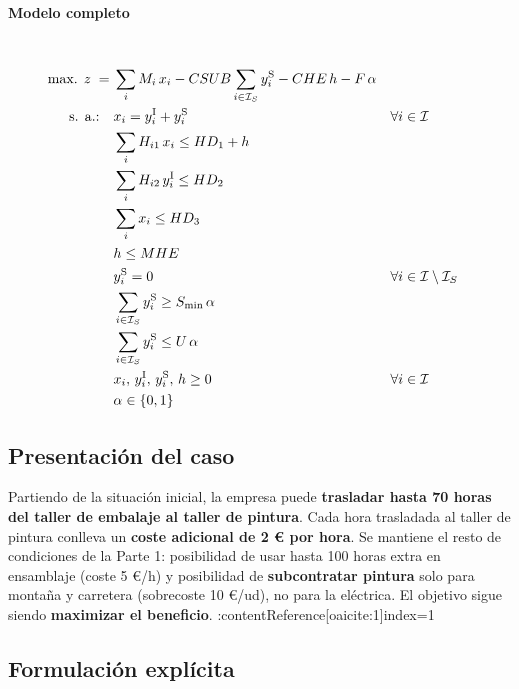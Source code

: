 \paragraph{Modelo completo}\mbox{}\\[-1mm]
\begin{align}
\mbox{max. } z \;=\;& 
\sum_i M_i\,x_i
- CSUB \sum_{i \in \mathcal{I}_S} y_i^{\mathrm{S}}
- CHE\,h
- F\,\alpha \notag\\
\mbox{s. a.:}\quad
& x_i = y_i^{\mathrm{I}} + y_i^{\mathrm{S}} && \forall i \in \mathcal{I} \notag\\
& \sum_i H_{i1}\,x_i \leq HD_1 + h \notag\\
& \sum_i H_{i2}\,y_i^{\mathrm{I}} \leq HD_2 \notag\\
& \sum_i x_i \leq HD_3 \notag\\
& h \leq MHE \notag\\
& y_i^{\mathrm{S}} = 0 && \forall i \in \mathcal{I}\setminus\mathcal{I}_S \notag\\
& \sum_{i \in \mathcal{I}_S} y_i^{\mathrm{S}} \geq S_{\min}\,\alpha \notag\\
& \sum_{i \in \mathcal{I}_S} y_i^{\mathrm{S}} \leq U\,\alpha \notag\\
& x_i,\, y_i^{\mathrm{I}},\, y_i^{\mathrm{S}},\, h \geq 0 && \forall i \in \mathcal{I} \notag\\
& \alpha \in \{0,1\} \notag
\end{align}



\subsection{Presentación del caso}

Partiendo de la situación inicial, la empresa puede \textbf{trasladar hasta 70 horas del taller de embalaje al taller de pintura}. Cada hora trasladada al taller de pintura conlleva un \textbf{coste adicional de 2 € por hora}. Se mantiene el resto de condiciones de la Parte 1: posibilidad de usar hasta 100 horas extra en ensamblaje (coste 5 €/h) y posibilidad de \textbf{subcontratar pintura} solo para montaña y carretera (sobrecoste 10 €/ud), no para la eléctrica. El objetivo sigue siendo \textbf{maximizar el beneficio}. :contentReference[oaicite:1]{index=1}


\subsection{Formulación explícita}

